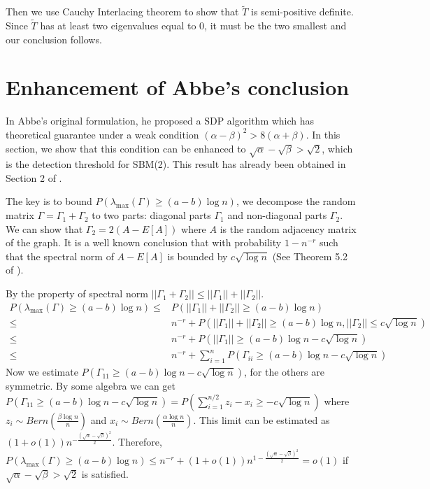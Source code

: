 \documentclass{ctexart}
\begin{document}
Then we use Cauchy Interlacing theorem to show that $\widetilde{T}$ is semi-positive definite.
Since $\widetilde{T}$ has at least two eigenvalues equal to 0, it must be the two smallest and our conclusion follows.

\section{Enhancement of Abbe's conclusion}\label{sec:original}
In Abbe's original formulation, he proposed a SDP algorithm which has theoretical
guarantee under a weak condition $(\alpha - \beta)^2 > 8(\alpha + \beta)$.
In this section, we show that this condition can be enhanced to $\sqrt{\alpha} - \sqrt{\beta} > \sqrt{2}$, which
is the detection threshold for SBM(2).
This result has already been obtained in Section 2 of \cite{hajek2016achieving}.

The key is to bound
$P(\lambda_{\max}(\Gamma) \geq (a-b)\log n)$,
we decompose the random matrix $\Gamma=\Gamma_1 +\Gamma_2$ to two parts: diagonal parts $\Gamma_1$ and non-diagonal parts $\Gamma_2$.
We can show that $\Gamma_2 = 2(A-E[A])$ where $A$ is the random adjacency matrix of the graph. It is a well known conclusion that
with probability $1-n^{-r}$ such that the spectral norm of $A-E[A]$ is bounded by $c\sqrt{\log n}$ (See Theorem 5.2 of \cite{lei2015consistency}).

By the property of spectral norm $||\Gamma_1 + \Gamma_2|| \leq ||\Gamma_1 || + ||\Gamma_2||$.
\begin{align*}
P(\lambda_{\max}(\Gamma) \geq (a-b)\log n) \leq & P(||\Gamma_1 || + ||\Gamma_2|| \geq (a-b) \log n)  \\
\leq & n^{-r} +
P(||\Gamma_1 || + ||\Gamma_2|| \geq (a-b) \log n, ||\Gamma_2||
\leq c\sqrt{\log n})\\
\leq & n^{-r} + P(||\Gamma_1|| \geq (a-b)\log n -c\sqrt{\log n}) \\
\leq & n^{-r} + \sum_{i=1}^n P(\Gamma_{ii} \geq (a-b)\log n -c\sqrt{\log n})
\end{align*}
Now we estimate $P(\Gamma_{11} \geq (a-b)\log n -c\sqrt{\log n})$, for the others are symmetric.
By some algebra we can get
$P(\Gamma_{11} \geq (a-b)\log n -c\sqrt{\log n}) = P(\sum_{i=1}^{n/2} z_i - x_i \geq -c\sqrt{\log n})$
where $z_i \sim Bern(\frac{\beta \log n}{n})$ and $x_i \sim Bern(\frac{\alpha \log n}{n})$.
This limit can be estimated as $(1+o(1))n^{-\frac{(\sqrt{\alpha}-\sqrt{\beta})^2}{2}}$.
Therefore, $P(\lambda_{\max}(\Gamma) \geq (a-b)\log n)\leq n^{-r} + (1+o(1))n^{1-\frac{(\sqrt{\alpha}-\sqrt{\beta})^2}{2}} = o(1)$
if $\sqrt{\alpha} - \sqrt{\beta} > \sqrt{2}$ is satisfied.
\end{document}
